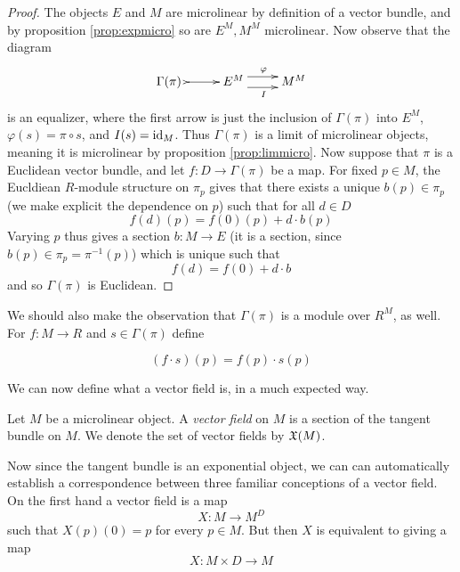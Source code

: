 \begin{proof}
  The objects \( E \) and \( M \) are microlinear by definition of a vector bundle, and by proposition \ref{prop:expmicro} so are \( E^M, M^M \) microlinear. Now observe that the diagram
  \begin{equation*}
    \xymatrix{
      {\Gamma(\pi)\,\,} \ar@{>->}[r] & E^M \ar@<1ex>[r]^{\varphi} \ar@<-1ex>[r]_{I} & M^M 
    }
  \end{equation*}
  is an equalizer, where the first arrow is just the inclusion of \( \Gamma(\pi) \) into \( E^M \), \( \varphi(s) = \pi\circ s \), and \( I(s) = \operatorname{id}_M \). Thus \( \Gamma(\pi) \) is a limit of microlinear objects, meaning it is microlinear by proposition \ref{prop:limmicro}. Now suppose that \( \pi \) is a Euclidean vector bundle, and let \( f:D\to \Gamma(\pi) \) be a map. For fixed \( p\in M \), the Eucldiean \( R \)-module structure on \( \pi_p \) gives that there exists a unique \( b(p)\in \pi_p \) (we make explicit the dependence on \( p \)) such that for all \( d\in D \)
  \begin{equation*}
    f(d)(p) = f(0)(p) + d\cdot b(p)
  \end{equation*}
  Varying \( p \) thus gives a section \( b:M\to E \) (it is a section, since \( b(p)\in \pi_p = \pi^{-1}(p) \)) which is unique such that
  \begin{equation*}
    f(d) = f(0) + d\cdot b
  \end{equation*}
  and so \( \Gamma(\pi) \) is Euclidean.
\end{proof}

We should also make the observation that \( \Gamma(\pi) \) is a module over \( R^M \), as well. For \( f:M\to R \) and \( s\in \Gamma(\pi) \) define

\begin{equation*}
  (f\cdot s)(p)=f(p)\cdot s(p)
\end{equation*}

We can now define what a vector field is, in a much expected way.

\begin{defn}
  Let \( M \) be a microlinear object. A \emph{vector field} on \( M \) is a section of the tangent bundle on \( M \). We denote the set of vector fields by \( \mathfrak X(M) \).
\end{defn}

Now since the tangent bundle is an exponential object, we can can automatically establish a correspondence between three familiar conceptions of a vector field. On the first hand a vector field is a map
\begin{equation*}
  X:M\to M^D
\end{equation*}
such that \( X(p)(0)=p \) for every \( p\in M \). But then \( X \) is equivalent to giving a map
\begin{equation*}
  X:M\times D \to M
\end{equation*}

